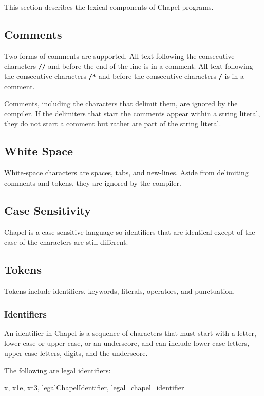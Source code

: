 \label{Lexical_Structure}

This section describes the lexical components of Chapel programs.

\subsection{Comments}
\label{Comments}

Two forms of comments are supported.  All text following the
consecutive characters {\tt //} and before the end of the line is in a
comment.  All text following the consecutive characters {\tt /*} and
before the consecutive characters {\tt */} is in a comment.

Comments, including the characters that delimit them, are ignored by
the compiler.  If the delimiters that start the comments appear within
a string literal, they do not start a comment but rather are part of
the string literal.

\subsection{White Space}
\label{White_Space}

White-space characters are spaces, tabs, and new-lines.  Aside from
delimiting comments and tokens, they are ignored by the compiler.

\subsection{Case Sensitivity}
\label{Case_Sensitivity}

Chapel is a case sensitive language so identifiers that are identical
except of the case of the characters are still different.

\subsection{Tokens}
\label{Tokens}

Tokens include identifiers, keywords, literals, operators, and
punctuation.

\subsubsection{Identifiers}
\label{Identifiers}

An identifier in Chapel is a sequence of characters that must start
with a letter, lower-case or upper-case, or an underscore, and can
include lower-case letters, upper-case letters, digits, and the
underscore.
\begin{example}
The following are legal identifiers:
\begin{chapel}
  x, x1e, xt3, legalChapelIdentifier, legal_chapel_identifier
\end{chapel}
\end{example}

